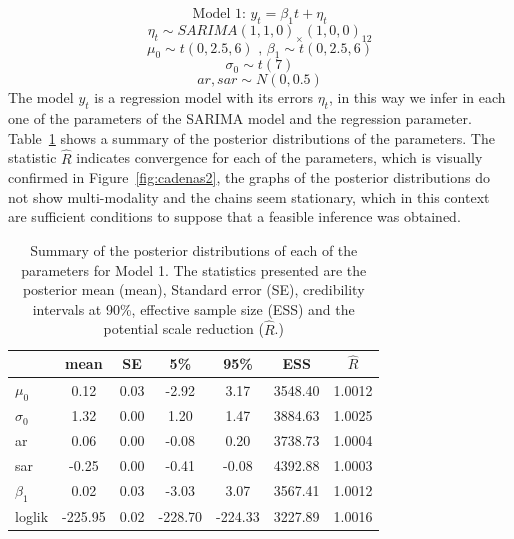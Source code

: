 %
$$\text{Model 1: } y_t = \beta_1 t+\eta_t$$
$$\eta_t \sim SARIMA(1,1,0)_\times(1,0,0)_{12}$$
$$ \mu_0 \sim t(0,2.5,6) \text{ , } \beta_1 \sim t(0,2.5,6)$$
$$ \sigma_0 \sim t(7)$$
$$ ar, sar  \sim N(0,0.5)$$
%
The model $y_t$ is a regression model with its errors $\eta_t$, in this way we infer in each one of the parameters of the SARIMA model and the regression parameter. Table~\ref{tab:resumen2} shows a summary of the posterior distributions of the parameters. The statistic $\hat{R}$ indicates convergence for each of the parameters, which is visually confirmed in Figure~\ref {fig:cadenas2}, the graphs of the posterior distributions do not show multi-modality and the chains seem stationary, which in this context are sufficient conditions to suppose that a feasible inference was obtained.
%
\begin{table}[ht]\centering
	\begin{tabular}{lcccccc}
		\hline
		& mean & SE & 5\% & 95\% & ESS & $\hat{R}$ \\ 
		\hline
		$\mu_0$ & 0.12 & 0.03 & -2.92 & 3.17 & 3548.40 & 1.0012 \\ 
		$\sigma_0$ & 1.32 & 0.00 & 1.20 & 1.47 & 3884.63 & 1.0025 \\ 
		ar & 0.06 & 0.00 & -0.08 & 0.20 & 3738.73 & 1.0004 \\ 
		sar & -0.25 & 0.00 & -0.41 & -0.08 & 4392.88 & 1.0003 \\ 
		$\beta_1$ & 0.02 & 0.03 & -3.03 & 3.07 & 3567.41 & 1.0012 \\ 
		loglik & -225.95 & 0.02 & -228.70 & -224.33 & 3227.89 & 1.0016 \\ 
		\hline
	\end{tabular}\smallskip 
	\caption{Summary of the posterior distributions of each of the parameters for Model 1. The statistics presented are the posterior mean (mean), Standard error (SE), credibility intervals at 90\%, effective sample size (ESS) and the potential scale reduction ($\hat{R}$.)} \label{tab:resumen2}
\end{table}
